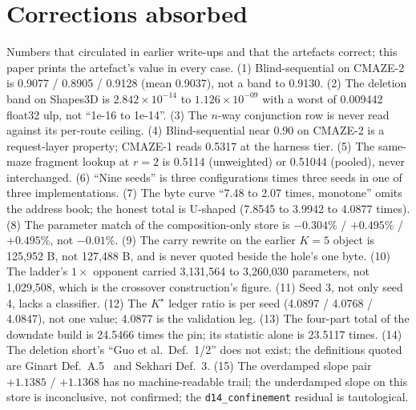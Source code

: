 \documentclass{article} %
\newcommand{\sci}[2]{\ensuremath{#1\times10^{#2}}}
\newcommand{\Kstar}{\ensuremath{K^{\star}}}
\begin{document}
\section{Corrections absorbed}
\label{app:corrections}

Numbers that circulated in earlier write-ups and that the artefacts correct; this paper prints the
artefact's value in every case. %
(1) Blind-sequential on CMAZE-2 is 0.9077 / 0.8905 / 0.9128 (mean 0.9037), not a band to 0.9130.
(2) The deletion band on Shapes3D is \sci{2.842}{-14} to \sci{1.126}{-09} with a worst of 0.009442
float32 ulp, not ``1e-16 to 1e-14''. (3) The $n$-way conjunction row is never read against its
per-route ceiling. (4) Blind-sequential near 0.90 on CMAZE-2 is a request-layer property; CMAZE-1
reads 0.5317 at the harness tier. (5) The same-maze fragment lookup at $r=2$ is 0.5114 (unweighted)
or 0.51044 (pooled), never interchanged. (6) ``Nine seeds'' is three configurations times three seeds
in one of three implementations. (7) The byte curve ``7.48 to 2.07 times, monotone'' omits the
address book; the honest total is U-shaped (7.8545 to 3.9942 to 4.0877 times). (8) The parameter
match of the composition-only store is $-0.304$\% / $+0.495$\% / $+0.495$\%, not $-0.01$\%. (9) The
carry rewrite on the earlier $K=5$ object is 125,952 B, not 127,488 B, and is never quoted beside the
hole's one byte. (10) The ladder's $1\times$ opponent carried 3,131,564 to 3,260,030 parameters, not
1,029,508, which is the crossover construction's figure. (11) Seed 3, not only seed 4, lacks a
classifier. (12) The $\Kstar$ ledger ratio is per seed (4.0897 / 4.0768 / 4.0847), not one value;
4.0877 is the validation leg. (13) The four-part total of the downdate build is 24.5466 times the pin;
its statistic alone is 23.5117 times. (14) The deletion short's ``Guo et al.\ Def.~1/2'' does not
exist; the definitions quoted are Ginart Def.~A.5~\citep{ginart2019making} and Sekhari Def.~3. %
(15) The overdamped slope pair $+1.1385$ / $+1.1368$ has no machine-readable trail; the underdamped %
slope on this store is inconclusive, not confirmed; the \texttt{d14\_confinement} residual is
tautological.

\fi
\end{document}
